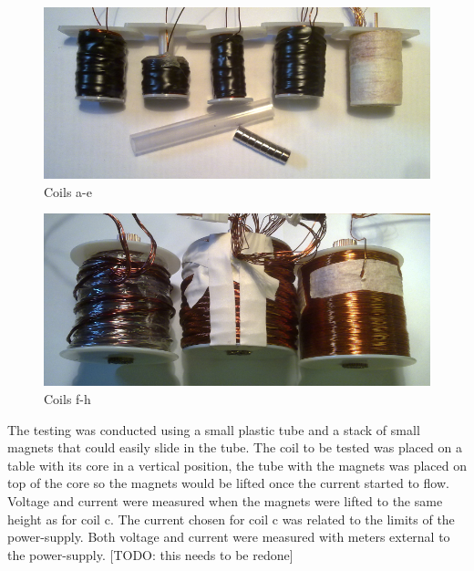 \documentclass[]{../common/elementary-physics}
\begin{document}
\begin{figure}[ht] \centering
	\includegraphics[scale=1.7]{coils-a-e} \caption{Coils a-e}
\end{figure}

\begin{figure}[ht] \centering
	\includegraphics[scale=1.7]{coils-f-h} \caption{Coils f-h}
\end{figure}

The testing was conducted using a small plastic tube and a stack of small magnets that could easily slide in the tube.
The coil to be tested was placed on a table with its core in a vertical position, the tube with the magnets was placed on top of the core so the magnets would be lifted once the current started to flow.
Voltage and current were measured when the magnets were lifted to the same height as for coil c.
The current chosen for coil c was related to the limits of the power-supply.
Both voltage and current were measured with meters external to the power-supply.
[TODO: this needs to be redone]
\end{document}
